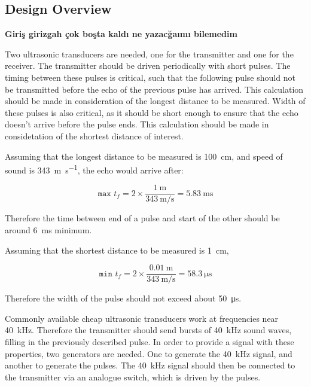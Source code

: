 \documentclass[12pt, a4paper]{article}
\begin{document}
    \pagebreak
    \subsection{Design Overview}
        
        \textbf{Giriş girizgah çok boşta kaldı ne yazacğaımı bilemedim}

        Two ultrasonic transducers are needed, one for the transmitter and one for the receiver. The transmitter should be driven periodically with short pulses. The timing between these pulses is critical, such that the following pulse should not be transmitted before the echo of the previous pulse has arrived. This calculation should be made in consideration of the longest distance to be measured. Width of these pulses is also critical, as it should be short enough to ensure that the echo doesn't arrive before the pulse ends. This calculation should be made in considetation of the shortest distance of interest. 

        Assuming that the longest distance to be measured is \SI{100}{\centi\metre}, and speed of sound is \SI{343}{\metre\per\second}, the echo would arrive after:

        \begin{equation}
            \texttt{max }t_f = 2 \times \frac{\SI{1}{\metre}}{\SI{343}{\metre\per\second}} = \SI{5.83}{\milli\second}
        \end{equation}

        \noindent Therefore the time between end of a pulse and start of the other should be around \SI{6}{\milli\second} minimum. 

        \noindent Assuming that the shortest distance to be measured is \SI{1}{\centi\metre}, 

        \begin{equation}
            \texttt{min }t_f = 2 \times \frac{\SI{0.01}{\metre}}{\SI{343}{\metre\per\second}} = \SI{58.3}{\micro\second}
        \end{equation}

        \noindent Therefore the width of the pulse should not exceed about \SI{50}{\micro\second}.


        \bigskip
        Commonly available cheap ultrasonic transducers work at frequencies near \SI{40}{\kilo\hertz}. Therefore the transmitter should send bursts of \SI{40}{\kilo\hertz} sound waves, filling in the previously described pulse. In order to provide a signal with these properties, two generators are needed. One to generate the \SI{40}{\kilo\hertz} signal, and another to generate the pulses. The \SI{40}{\kilo\hertz} signal should then be connected to the transmitter via an analogue switch, which is driven by the pulses.
\end{document}
